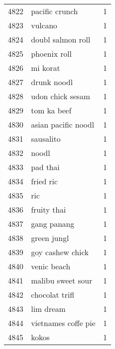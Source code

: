 \begin{tabular}{llr}
4822 &                                     pacific crunch &      1 \\
4823 &                                            vulcano &      1 \\
4824 &                                  doubl salmon roll &      1 \\
4825 &                                       phoenix roll &      1 \\
4826 &                                           mi korat &      1 \\
4827 &                                        drunk noodl &      1 \\
4828 &                                   udon chick sesam &      1 \\
4829 &                                        tom ka beef &      1 \\
4830 &                                asian pacific noodl &      1 \\
4831 &                                          sausalito &      1 \\
4832 &                                              noodl &      1 \\
4833 &                                           pad thai &      1 \\
4834 &                                          fried ric &      1 \\
4835 &                                                ric &      1 \\
4836 &                                        fruity thai &      1 \\
4837 &                                        gang panang &      1 \\
4838 &                                        green jungl &      1 \\
4839 &                                   goy cashew chick &      1 \\
4840 &                                        venic beach &      1 \\
4841 &                                  malibu sweet sour &      1 \\
4842 &                                     chocolat trifl &      1 \\
4843 &                                          lim dream &      1 \\
4844 &                                vietnames coffe pie &      1 \\
4845 &                                              kokos &      1 \\

\end{tabular}
